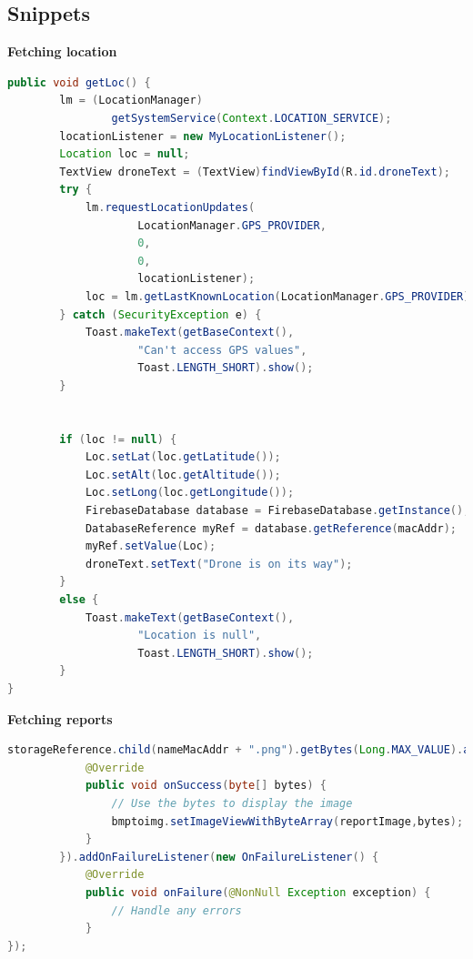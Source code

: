 \subsection{Snippets}
\newpage
\textbf{Fetching location}
\begin{lstlisting}[language=Java]
public void getLoc() {
        lm = (LocationManager)
                getSystemService(Context.LOCATION_SERVICE);
        locationListener = new MyLocationListener();
        Location loc = null;
        TextView droneText = (TextView)findViewById(R.id.droneText);
        try {
            lm.requestLocationUpdates(
                    LocationManager.GPS_PROVIDER,
                    0,
                    0,
                    locationListener);
            loc = lm.getLastKnownLocation(LocationManager.GPS_PROVIDER);
        } catch (SecurityException e) {
            Toast.makeText(getBaseContext(),
                    "Can't access GPS values",
                    Toast.LENGTH_SHORT).show();
        }


        if (loc != null) {
            Loc.setLat(loc.getLatitude());
            Loc.setAlt(loc.getAltitude());
            Loc.setLong(loc.getLongitude());
            FirebaseDatabase database = FirebaseDatabase.getInstance();
            DatabaseReference myRef = database.getReference(macAddr);
            myRef.setValue(Loc);
            droneText.setText("Drone is on its way");
        } 
        else {
            Toast.makeText(getBaseContext(),
                    "Location is null",
                    Toast.LENGTH_SHORT).show();
        }
}
\end{lstlisting}
\textbf{Fetching reports}
\begin{lstlisting}[language=Java]
storageReference.child(nameMacAddr + ".png").getBytes(Long.MAX_VALUE).addOnSuccessListener(new OnSuccessListener<byte[]>() {
            @Override
            public void onSuccess(byte[] bytes) {
                // Use the bytes to display the image
                bmptoimg.setImageViewWithByteArray(reportImage,bytes);
            }
        }).addOnFailureListener(new OnFailureListener() {
            @Override
            public void onFailure(@NonNull Exception exception) {
                // Handle any errors
            }
});
\end{lstlisting}
